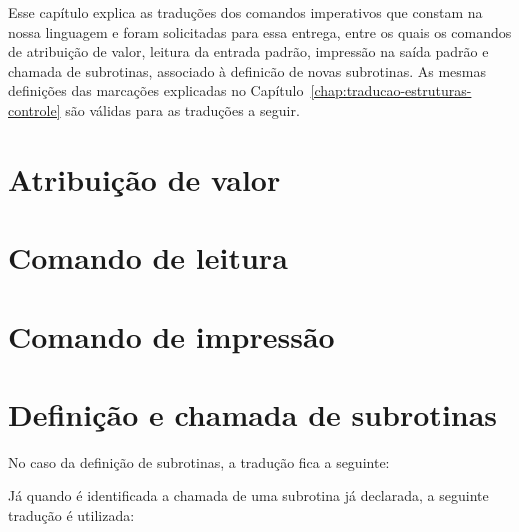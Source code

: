
Esse capítulo explica as traduções dos comandos imperativos que constam na nossa linguagem e foram solicitadas para essa entrega, entre os quais os comandos de atribuição de valor, leitura da entrada padrão, impressão na saída padrão e chamada de subrotinas, associado à definicão de novas subrotinas. As mesmas definições das marcações explicadas no Capítulo~\ref{chap:traducao-estruturas-controle} são válidas para as traduções a seguir.

\section{Atribuição de valor}
\label{sec:atribuicao-valor}



\section{Comando de leitura}
\label{sec:leitura}



\section{Comando de impressão}
\label{sec:impressao}



\section{Definição e chamada de subrotinas}
\label{sec:subrotinas}

No caso da definição de subrotinas, a tradução fica a seguinte:



Já quando é identificada a chamada de uma subrotina já declarada, a seguinte tradução é utilizada:


